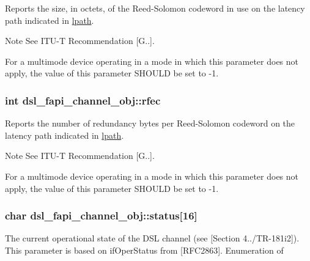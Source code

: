 Reports the size, in octets, of the Reed-\/\-Solomon codeword in use on the latency path indicated in \hyperlink{structdsl__fapi__channel__obj_a29ec0882fb5449a659485d51f50b3b52}{lpath}. \begin{DoxyNote}{Note}
See I\-T\-U-\/\-T Recommendation \mbox{[}G..\mbox{]}. 

For a multimode device operating in a mode in which this parameter does not apply, the value of this parameter S\-H\-O\-U\-L\-D be set to -\/1. 
\end{DoxyNote}
\hypertarget{structdsl__fapi__channel__obj_a077979a17ac2addeeb98f721201c74ce}{
\subsubsection[{rfec}]{\setlength{\rightskip}{0pt plus 5cm}int dsl\-\_\-fapi\-\_\-channel\-\_\-obj\-::rfec}}\label{structdsl__fapi__channel__obj_a077979a17ac2addeeb98f721201c74ce}
Reports the number of redundancy bytes per Reed-\/\-Solomon codeword on the latency path indicated in \hyperlink{structdsl__fapi__channel__obj_a29ec0882fb5449a659485d51f50b3b52}{lpath}. \begin{DoxyNote}{Note}
See I\-T\-U-\/\-T Recommendation \mbox{[}G..\mbox{]}. 

For a multimode device operating in a mode in which this parameter does not apply, the value of this parameter S\-H\-O\-U\-L\-D be set to -\/1. 
\end{DoxyNote}
\hypertarget{structdsl__fapi__channel__obj_a5769b6346cba4849ba38c2da2e99939f}{
\subsubsection[{status}]{\setlength{\rightskip}{0pt plus 5cm}char dsl\-\_\-fapi\-\_\-channel\-\_\-obj\-::status\mbox{[}16\mbox{]}}}\label{structdsl__fapi__channel__obj_a5769b6346cba4849ba38c2da2e99939f}
The current operational state of the D\-S\-L channel (see \mbox{[}Section 4../\-T\-R-\/181i2\mbox{]}). This parameter is based on if\-Oper\-Status from \mbox{[}R\-F\-C2863\mbox{]}. Enumeration of
